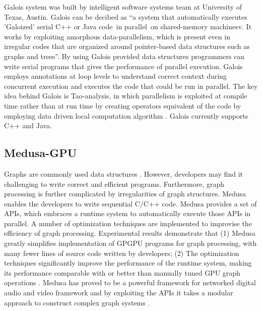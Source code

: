      Galois system was built by intelligent software systems team at
     University of Texas, Austin. Galois can be decibed as ``a system
     that automatically
     executes 'Galoized' serial C++ or Java code in parallel on
     shared-memory machinesv\cite{www-galoisSite}. It works by exploiting
     amorphous
     data-parallelism, which is present even in irregular codes that
     are organized around pointer-based data structures such as graphs
     and trees''. By using Galois provided data structures programmers
     can write serial programs that gives the performance of parallel
     execution. Galois employs annotations at loop levels to
     understand correct context during concurrent execution and
     executes the code that could be run in parallel. The key idea
     behind Galois is Tao-analysis, in which parallelism is exploited
     at compile time rather than at run time by creating operators
     equivalent of the code by employing data driven local computation
     algorithm \cite{taoParallelismPaper}. Galois currently supports
     C++ and Java.

     \pv
	   
\subsection{Medusa-GPU}
     
     Graphs are commonly used data structures . However, developers
     may find it challenging to write correct and efficient
     programs. Furthermore, graph processing is further complicated by
     irregularities of graph structures. Medusa enables the developers
     to write sequential C/C++ code. Medusa provides a set of APIs,
     which embraces a runtime system to
     automatically execute those APIs in parallel\cite{paper_medusa}.
     A number of optimization techniques are implemented to improvise the
     efficiency of graph processing. Experimental results demonstrate
     that (1) Medusa greatly simplifies implementation of GPGPU programs
     for graph processing, with many fewer lines of source code written by
     developers; (2) The optimization techniques significantly improve
     the performance of the runtime system, making its performance
     comparable with or better than manually tuned GPU graph
     operations \cite{paper_medusa}. Medusa has proved to be a powerful
     framework for networked digital audio and video
     framework and by exploiting the APIs it takes a
     modular approach to construct complex graph systems \cite{www-medusa}.

